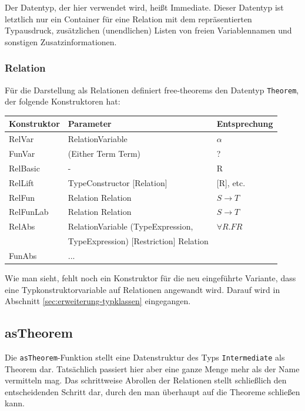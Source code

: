 \documentclass[11pt]{article} %
\begin{document}
Der Datentyp, der hier verwendet wird, heißt Immediate. Dieser Datentyp ist letztlich nur ein Container für eine Relation mit
dem repräsentierten Typausdruck, zusätzlichen (unendlichen) Listen von freien Variablennamen und sonstigen Zusatzinformationen.

\subsubsection{Relation}

Für die Darstellung als Relationen definiert free-theorems den Datentyp \texttt{Theorem}, der folgende Konstruktoren hat:


\begin{tabular}{| l | l | l |}
\hline
Konstruktor & Parameter & Entsprechung \\
\hline
RelVar & RelationVariable & $\alpha$ \\
FunVar & (Either Term Term) & ? \\
RelBasic & - & R \\
RelLift & TypeConstructor [Relation] & [R], etc. \\
RelFun & Relation Relation & $S \rightarrow T$ \\
RelFunLab & Relation Relation & $S \rightarrow T$ \\
RelAbs & RelationVariable (TypeExpression,  & $\forall R . F R$ \\
& TypeExpression) [Restriction] Relation & \\
FunAbs & ... & \\
\hline
\end{tabular}

Wie man sieht, fehlt noch ein Konstruktor für die neu eingeführte Variante, dass eine Typkonstruktorvariable auf Relationen
angewandt wird. Darauf wird in Abschnitt \ref{sec:erweiterung-typklassen} eingegangen.

\subsection{asTheorem}

Die \texttt{asTheorem}-Funktion stellt eine Datenstruktur des Typs \texttt{Intermediate} als Theorem dar. Tatsächlich passiert hier aber eine ganze Menge mehr als der Name
vermitteln mag. Das schrittweise Abrollen der Relationen stellt schließlich den entscheidenden Schritt dar, durch den man überhaupt auf
die Theoreme schließen kann.
\end{document}
